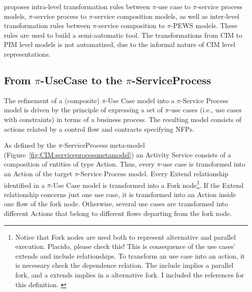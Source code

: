 


\pisodm  proposes intra-level transformation rules between $\pi$-use case to $\pi$-service process models, $\pi$-service process to $\pi$-service composition  models, as well as inter-level transformation rules between $\pi$-service composition to $\pi$-PEWS models. 
These rules are used to build a semi-automatic tool.
The transformations from CIM to PIM level models is not automatized, due to the informal nature of CIM level representations.
 
\subsection{From $\pi$-UseCase to the $\pi$-ServiceProcess}

The refinement of a (composite) $\pi$-Use Case model into a $\pi$-Service Process model is driven by the principle of expressing a set of $\pi$-use cases (i.e., use cases with constraints)   in terms of  a business process.
The resulting model consists of actions related by a control flow and contracts specifying NFPs. 

As defined by the $\pi$-ServiceProcess  meta-model (Figure~\ref{fig:CIM:serviceprocessmetamodel}) an {\sc Activity Service} consists of a composition of  entities of type {\sc Action}. 
Thus, every {\sf $\pi$-use case} is transformed into an {\sf Action} of the target $\pi$-Service Process model.  
Every {\sf Extend} relationship identified in a $\pi$-Use Case model is
transformed into a  {\sf Fork node}\footnote{Notice that Fork nodes are used
both to represent alternative and parallel execution. {\color{red} \sc Placido,
please check this!} {\color{blue} This is consequence of the use cases' extends
and include relationships. To transform an use case into an action, it is
necessary check the dependence relation. The include implies a parallel fork,
and a extends implies in a alternative fork. I included the references for this definition.
} }\cite{valeriaThesis,placidoPhDThesis2012}.
If the {\sf Extend} relationship concerns just one {\sf use case}, it is transformed into an {\sf Action} inside one flow of the fork node. 
Otherwise, several  {\sf use cases} are transformed into different {\sf Actions} that belong to different flows departing from the fork node.   

